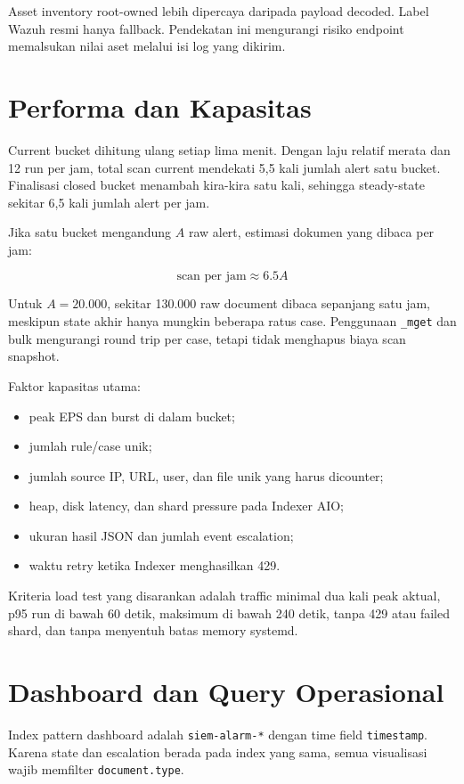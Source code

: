 \documentclass[11pt,a4paper,oneside]{report}
\DeclareRobustCommand{\code}[1]{\nolinkurl{#1}}
\begin{document}
Asset inventory root-owned lebih dipercaya daripada payload decoded. Label Wazuh
resmi hanya fallback. Pendekatan ini mengurangi risiko endpoint memalsukan nilai aset
melalui isi log yang dikirim.

\chapter{Performa dan Kapasitas}

Current bucket dihitung ulang setiap lima menit. Dengan laju relatif merata dan
12 run per jam, total scan current mendekati 5,5 kali jumlah alert satu bucket.
Finalisasi closed bucket menambah kira-kira satu kali, sehingga steady-state sekitar
6,5 kali jumlah alert per jam.

Jika satu bucket mengandung $A$ raw alert, estimasi dokumen yang dibaca per jam:

\[
  \text{scan per jam} \approx 6.5A
\]

Untuk $A=20.000$, sekitar 130.000 raw document dibaca sepanjang satu jam, meskipun
state akhir hanya mungkin beberapa ratus case. Penggunaan \code{\_mget} dan bulk
mengurangi round trip per case, tetapi tidak menghapus biaya scan snapshot.

Faktor kapasitas utama:

\begin{itemize}
  \item peak EPS dan burst di dalam bucket;
  \item jumlah rule/case unik;
  \item jumlah source IP, URL, user, dan file unik yang harus dicounter;
  \item heap, disk latency, dan shard pressure pada Indexer AIO;
  \item ukuran hasil JSON dan jumlah event escalation;
  \item waktu retry ketika Indexer menghasilkan 429.
\end{itemize}

Kriteria load test yang disarankan adalah traffic minimal dua kali peak aktual,
p95 run di bawah 60 detik, maksimum di bawah 240 detik, tanpa 429 atau failed shard,
dan tanpa menyentuh batas memory systemd.

\chapter{Dashboard dan Query Operasional}

Index pattern dashboard adalah \code{siem-alarm-*} dengan time field
\code{timestamp}. Karena state dan escalation berada pada index yang sama, semua
visualisasi wajib memfilter \code{document.type}.
\end{document}
